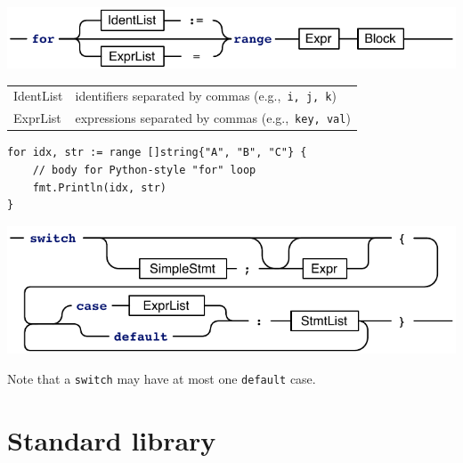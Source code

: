 \documentclass{article}
\begin{document}
\begin{multicols*}{3}
  \filbreak
  \includegraphics[width=\linewidth]{for-range}

  \begin{tabular}{p{0.35in}p{2.65in}}
  IdentList & identifiers separated by commas (e.g.,~\lstinline!i, j, k!) \\
  ExprList & expressions separated by commas (e.g.,~\lstinline!key, val!) \\
  \end{tabular}

  \vspace{\baselineskip}
\begin{lstlisting}[frame=single,escapechar=|]
for idx, str := range []string{"A", "B", "C"} {
    // body for Python-style "for" loop
    fmt.Println(idx, str)
}
\end{lstlisting}

  \filbreak
  \includegraphics[width=\linewidth]{switch-expr}

  Note that a \lstinline{switch} may have at most one \lstinline{default} case.

  \filbreak
  \section*{Standard library}


\end{multicols*}
\end{document}
